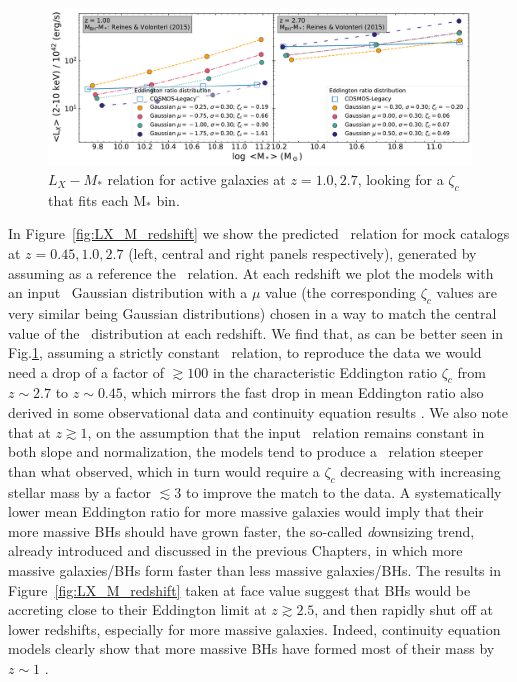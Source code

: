 \begin{figure}
	\includegraphics[width=\textwidth]{Figs/Chapter3/Best_Edd_for_mass_active_z2.7.pdf}
	\caption{$L_X-M_*$ relation for active galaxies at $z=1.0,2.7$, looking for a $\zeta_c$ that fits each M$_*$ bin.}
	\label{fig:LX_foreach_M}
\end{figure}

In Figure~\ref{fig:LX_M_redshift} we show the predicted \LXMS\ relation for mock catalogs at $z=0.45,1.0,2.7$ (left, central and right panels respectively), generated by assuming as a reference the \citet{2015ApJ...813...82R} \MBHMS\ relation. 
At each redshift we plot the models with an input \PLz\ Gaussian distribution with a $\mu$ value (the corresponding $\zeta_c$ values are very similar being Gaussian distributions) chosen in a way to match the central value of the \LXMS\ distribution at each redshift.
We find that, as can be better seen in Fig.\ref{fig:LX_foreach_M}, assuming a strictly constant \MBHMS\ relation, to reproduce the data we would need a drop of a factor of $\gtrsim 100$ in the characteristic Eddington ratio $\zeta_c$ from $z\sim 2.7$ to $z\sim 0.45$, which mirrors the fast drop in mean Eddington ratio also derived in some observational data and continuity equation results \citep[see, e.g., Fig. 12 in][]{Shankar13Acc}. We also note that at $z \gtrsim 1$, on the assumption that the input \MBHMS\ relation remains constant in both slope and normalization, the models tend to produce a \LXMS\ relation steeper than what observed, which in turn would require a $\zeta_c$ decreasing with increasing stellar mass by a factor $\lesssim 3$ to improve the match to the data. A systematically lower mean Eddington ratio for more massive galaxies would imply that their more massive BHs should have grown faster, the so-called {\emph downsizing} trend, already introduced and discussed in the previous Chapters, in which more massive galaxies/BHs form faster than less massive galaxies/BHs. The results in Figure~\ref{fig:LX_M_redshift} taken at face value suggest that BHs would be accreting close to their Eddington limit at $z\gtrsim 2.5$, and then rapidly shut off at lower redshifts, especially for more massive galaxies. Indeed, continuity equation models clearly show that more massive BHs have formed most of their mass by $z\sim 1$ \citep[e.g.,][]{2004MNRAS.351..169M,2020MNRAS.493.1500S}.



